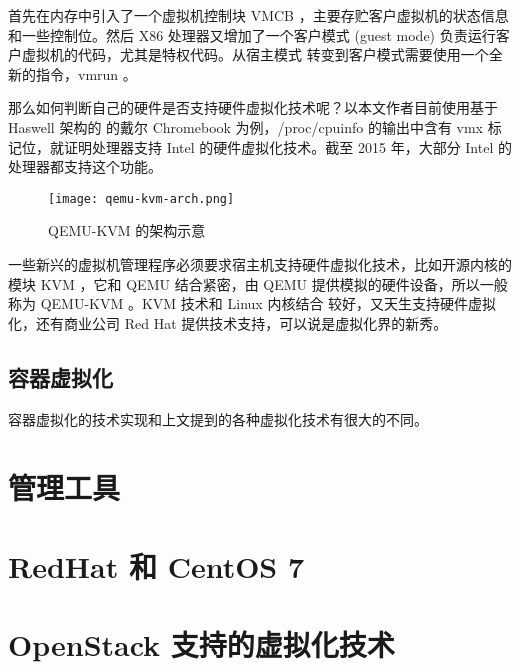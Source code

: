 首先在内存中引入了一个虚拟机控制块 VMCB ，主要存贮客户虚拟机的状态信息和一些控制位。然后 X86
处理器又增加了一个客户模式 (guest mode) 负责运行客户虚拟机的代码，尤其是特权代码。从宿主模式
转变到客户模式需要使用一个全新的指令，vmrun 。

那么如何判断自己的硬件是否支持硬件虚拟化技术呢？以本文作者目前使用基于 Haswell 架构的
的戴尔 Chromebook 为例，/proc/cpuinfo 的输出中含有 vmx 标记位，就证明处理器支持
 Intel 的硬件虚拟化技术。截至 2015 年，大部分 Intel 的处理器都支持这个功能。

 \begin{figure}[h]
     \centering
     \texttt{[image: qemu-kvm-arch.png]}
     \caption{QEMU-KVM 的架构示意}
 \end{figure}

一些新兴的虚拟机管理程序必须要求宿主机支持硬件虚拟化技术，比如开源内核的模块 KVM ，它和 QEMU
结合紧密，由 QEMU 提供模拟的硬件设备，所以一般称为 QEMU-KVM 。KVM 技术和 Linux 内核结合
较好，又天生支持硬件虚拟化，还有商业公司 Red Hat 提供技术支持，可以说是虚拟化界的新秀。

\subsection{容器虚拟化}

容器虚拟化的技术实现和上文提到的各种虚拟化技术有很大的不同。

\section{管理工具}

\section{RedHat 和 CentOS 7}

\section{OpenStack 支持的虚拟化技术}
